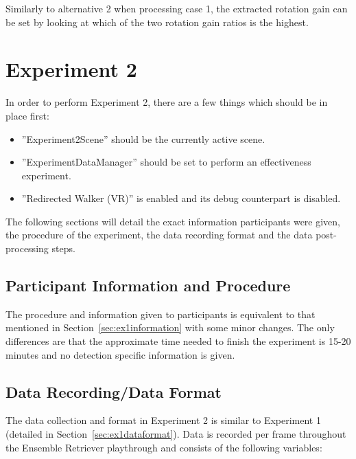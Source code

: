 Similarly to alternative 2 when processing case 1, the extracted rotation gain can be set by looking at which of the two rotation gain ratios is the highest.

\section{Experiment 2}
In order to perform Experiment 2, there are a few things which should be in place first:

\begin{itemize}
    \item ''Experiment2Scene'' should be the currently active scene.
    \item ''ExperimentDataManager'' should be set to perform an effectiveness experiment.
    \item ''Redirected Walker (VR)'' is enabled and its debug counterpart is disabled.
\end{itemize}

The following sections will detail the exact information participants were given, the procedure of the experiment, the data recording format and the data post-processing steps.

\subsection{Participant Information and Procedure}\label{sec:ex2information}
The procedure and information given to participants is equivalent to that mentioned in Section~\ref{sec:ex1information} with some minor changes. The only differences are that the approximate time needed to finish the experiment is 15-20 minutes and no detection specific information is given. 

\subsection{Data Recording/Data Format}\label{sec:ex2dataformat}
The data collection and format in Experiment 2 is similar to Experiment 1 (detailed in Section~\ref{sec:ex1dataformat}). Data is recorded per frame throughout the Ensemble Retriever playthrough and consists of the following variables:

